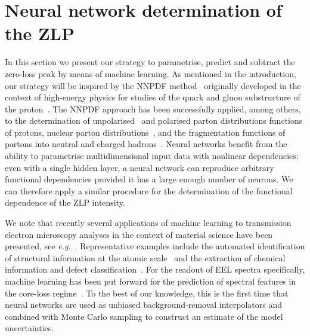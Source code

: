 \section{Neural network determination of the ZLP}
\label{sec:methodology}

In this section we present our strategy to parametrise, predict and subtract 
the zero-loss peak by means of machine learning.
%
As mentioned in the introduction, our strategy will be inspired by the 
NNPDF method~\cite{Rojo:2018qdd} originally developed in the context of high-energy physics
for studies of the quark and gluon substructure of the proton~\cite{Gao:2017yyd}.
%
The NNPDF approach has been successfully applied, among others, to
the determination of
unpolarised~\cite{DelDebbio:2007ee,Ball:2008by,Ball:2012cx,Ball:2014uwa,Ball:2017nwa}
and polarised parton distributions functions of protons, nuclear
parton distributions~\cite{AbdulKhalek:2019mzd,AbdulKhalek:2020yuc}, and the
fragmentation functions of partons into neutral and charged
hadrons~\cite{Bertone:2017tyb,Bertone:2018ecm}.
%
Neural networks benefit from the ability to parametrise 
multidimensional input data with nonlinear dependencies:
even with a single hidden layer, a neural network can reproduce arbitrary 
functional dependencies provided it has a large enough number of neurons.
%
We can therefore apply a similar procedure for the determination of the
functional dependence of the ZLP intensity. 

We note that recently several applications of machine learning
to transmission electron microscopy analyses 
in the context of material science have been
presented, see {\it e.g.}~\cite{Gordon:2020, Zhang:2019, Jany:2017, Ziatdinov:2017,10.1145/2834892.2834896,doi:10.1021/acsnano.7b07504,cite-key}.
%
Representative examples
include the automated identification
of structural information at the atomic scale~\cite{10.1145/2834892.2834896} 
and the extraction of chemical information
and defect classification~\cite{doi:10.1021/acsnano.7b07504}.
%
For the readout of EEL spectra specifically, 
machine learning has been put forward for the prediction
of spectral features in the core-loss regime~\cite{Kiyohara:2018}.
%
To the best of our knowledge, this is the first time that neural networks are used as 
unbiased background-removal interpolators and combined with 
Monte Carlo sampling to construct an estimate of the model uncertainties.\\

